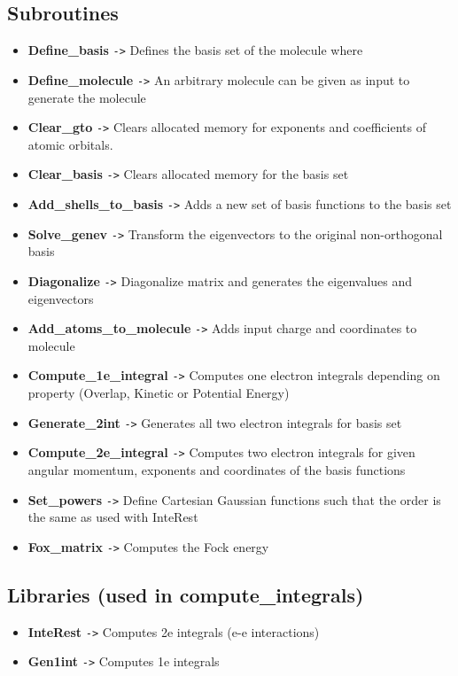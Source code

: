 \documentclass[11pt,a4paper]{article}
\begin{document}
\subsection*{Subroutines}
\begin{itemize}
    \item \textbf{Define\_basis} \texttt{->} Defines the basis set of the molecule where
    \item \textbf{Define\_molecule} \texttt{->} An arbitrary molecule can be given as input to generate the molecule
    \item \textbf{Clear\_gto} \texttt{->} Clears allocated memory for exponents and coefficients of atomic orbitals.
    \item \textbf{Clear\_basis} \texttt{->} Clears allocated memory for the basis set
    \item \textbf{Add\_shells\_to\_basis} \texttt{->} Adds a new set of basis functions to the basis set
    \item \textbf{Solve\_genev} \texttt{->} Transform the eigenvectors to the original non-orthogonal basis
    \item \textbf{Diagonalize} \texttt{->} Diagonalize matrix and generates the eigenvalues and eigenvectors
    \item \textbf{Add\_atoms\_to\_molecule} \texttt{->} Adds input charge and coordinates to molecule
    \item \textbf{Compute\_1e\_integral} \texttt{->} Computes one electron integrals depending on property (Overlap, Kinetic or Potential Energy)
    \item \textbf{Generate\_2int} \texttt{->} Generates all two electron integrals for basis set
    \item \textbf{Compute\_2e\_integral} \texttt{->} Computes two electron integrals for given angular momentum, exponents and coordinates of the basis functions
    \item \textbf{Set\_powers} \texttt{->} Define Cartesian Gaussian functions such that the order is the same as used with InteRest
    \item \textbf{Fox\_matrix} \texttt{->} Computes the Fock energy 

\end{itemize}

\subsection*{Libraries (used in compute\_integrals)}
\begin{itemize}
    \item \textbf{InteRest} \texttt{->} Computes 2e integrals (e-e interactions)
    \item \textbf{Gen1int} \texttt{->} Computes 1e integrals
\end{itemize}
\end{document}

